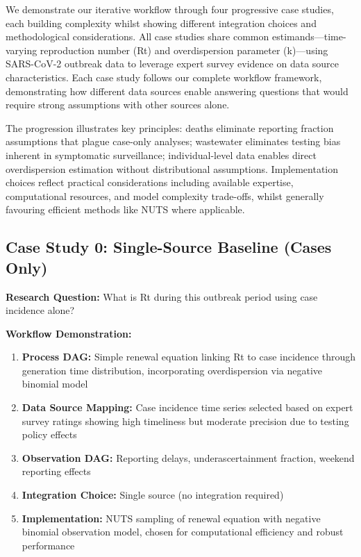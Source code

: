 \documentclass{article}
\begin{document}
We demonstrate our iterative workflow through four progressive case studies, each building complexity whilst showing different integration choices and methodological considerations.
All case studies share common estimands—time-varying reproduction number (Rt) and overdispersion parameter (k)—using SARS-CoV-2 outbreak data to leverage expert survey evidence on data source characteristics.
Each case study follows our complete workflow framework, demonstrating how different data sources enable answering questions that would require strong assumptions with other sources alone.

The progression illustrates key principles: deaths eliminate reporting fraction assumptions that plague case-only analyses; wastewater eliminates testing bias inherent in symptomatic surveillance; individual-level data enables direct overdispersion estimation without distributional assumptions.
Implementation choices reflect practical considerations including available expertise, computational resources, and model complexity trade-offs, whilst generally favouring efficient methods like NUTS where applicable.

\subsection{Case Study 0: Single-Source Baseline (Cases Only)}

\textbf{Research Question:} What is Rt during this outbreak period using case incidence alone?

\textbf{Workflow Demonstration:}
\begin{enumerate}
    \item \textbf{Process DAG:} Simple renewal equation linking Rt to case incidence through generation time distribution, incorporating overdispersion via negative binomial model
    \item \textbf{Data Source Mapping:} Case incidence time series selected based on expert survey ratings showing high timeliness but moderate precision due to testing policy effects
    \item \textbf{Observation DAG:} Reporting delays, underascertainment fraction, weekend reporting effects
    \item \textbf{Integration Choice:} Single source (no integration required)
    \item \textbf{Implementation:} NUTS sampling of renewal equation with negative binomial observation model, chosen for computational efficiency and robust performance
\end{enumerate}
\end{document}
